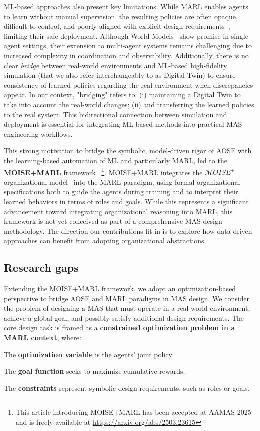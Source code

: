 \documentclass[pdflatex,sn-mathphys-num]{sn-jnl}%
\theoremstyle{thmstyleone}%
\theoremstyle{thmstyletwo}%
\theoremstyle{thmstylethree}%
\begin{document}
ML-based approaches also present key limitations. While MARL enables agents to learn without manual supervision, the resulting policies are often opaque, difficult to control, and poorly aligned with explicit design requirements~\cite{Nguyen2020, Anastassacos2020}, limiting their safe deployment.
Although World Models~\cite{Ha2018} show promise in single-agent settings, their extension to multi-agent systems remains challenging due to increased complexity in coordination and observability.
Additionally, there is no clear \emph{bridge} between real-world environments and ML-based high-fidelity simulation (that we also refer interchangeably to as Digital Twin) to ensure consistency of learned policies regarding the real environment when discrepancies appear. In our context, "bridging" refers to: (i) maintaining a Digital Twin to take into account the real-world changes; (ii) and transferring the learned policies to the real system. This bidirectional connection between simulation and deployment is essential for integrating ML-based methods into practical MAS engineering workflows.

This strong motivation to bridge the symbolic, model-driven rigor of AOSE with the learning-based automation of ML and particularly MARL, led to the \textbf{MOISE+MARL} framework~\cite{soule2025moisemarl}%
\footnote{This article introducing MOISE+MARL has been accepted at AAMAS 2025 and is freely available at \url{https://arxiv.org/abs/2503.23615}}.
%
MOISE+MARL integrates the $\mathcal{M}OISE^+$ organizational model~\cite{Hubner2002} into the MARL paradigm, using formal organizational specifications both to guide the agents during training and to interpret their learned behaviors in terms of roles and goals. While this represents a significant advancement toward integrating organizational reasoning into MARL, this framework is not yet conceived as part of a comprehensive MAS design methodology. The direction our contributions fit in is to explore how data-driven approaches can benefit from adopting organizational abstractions.

\subsection{Research gaps}

Extending the MOISE+MARL framework, we adopt an optimization-based perspective to bridge AOSE and MARL paradigms in MAS design. We consider the problem of designing a MAS that must operate in a real-world environment, achieve a global goal, and possibly satisfy additional design requirements. The core design task is framed as a \textbf{constrained optimization problem in a MARL context}, where:
\begin{enumerate*}[label={\roman*)}, itemjoin={; \quad}]
    \item The \textbf{optimization variable} is the agents' joint policy
    \item The \textbf{goal function} seeks to maximize cumulative rewards.
    \item The \textbf{constraints} represent symbolic design requirements, such as roles or goals.
\end{enumerate*}
\end{document}
